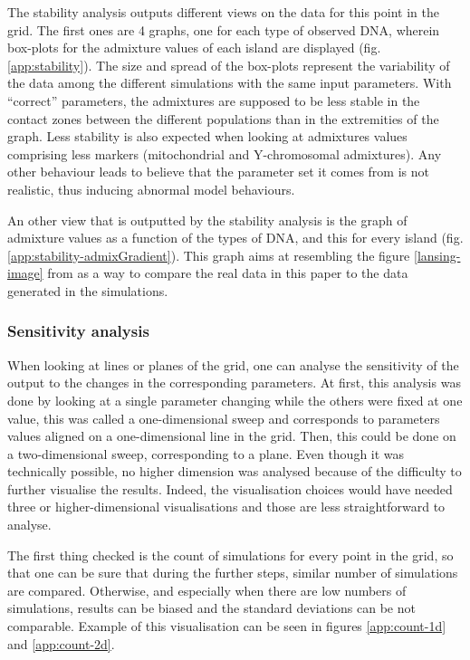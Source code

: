 \documentclass[a4paper,12pt]{report}
\begin{document}
The stability analysis outputs different views on the data for this point in the grid. The first ones are 4 graphs, one for each type of observed DNA, wherein box-plots for the admixture values of each island are displayed (fig. \ref{app:stability}). The size and spread of the box-plots represent the variability of the data among the different simulations with the same input parameters. With “correct” parameters, the admixtures are supposed to be less stable in the contact zones between the different populations than in the extremities of the graph. Less stability is also expected when looking at admixtures values comprising less markers (mitochondrial and Y-chromosomal admixtures). Any other behaviour leads to believe that the parameter set it comes from is not realistic, thus inducing abnormal model behaviours.

An other view that is outputted by the stability analysis is the graph of admixture values as a function of the types of DNA, and this for every island (fig. \ref{app:stability-admixGradient}). This graph aims at resembling the figure \ref{lansing-image} from \cite{Lan01} as a way to compare the real data in this paper to the data generated in the simulations.


\subsubsection{Sensitivity analysis}
When looking at lines or planes of the grid, one can analyse the sensitivity of the output to the changes in the corresponding parameters.
At first, this analysis was done by looking at a single parameter changing while the others were fixed at one value, this was called a one-dimensional sweep and corresponds to parameters values aligned on a one-dimensional line in the grid. Then, this could be done on a two-dimensional sweep, corresponding to a plane. Even though it was technically possible, no higher dimension was analysed because of the difficulty to further visualise the results. Indeed, the visualisation choices would have needed three or higher-dimensional visualisations and those are less straightforward to analyse.

The first thing checked is the count of simulations for every point in the grid, so that one can be sure that during the further steps, similar number of simulations are compared. Otherwise, and especially when there are low numbers of simulations, results can be biased and the standard deviations can be not comparable. Example of this visualisation can be seen in figures \ref{app:count-1d} and \ref{app:count-2d}.
\end{document}
